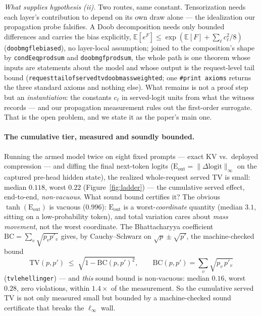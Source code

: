 \documentclass[11pt]{article}
\renewcommand{\_}{\WCorigunderscore\allowbreak}
\begin{document}
\emph{What supplies hypothesis (ii).} Two routes, same constant.
Tensorization needs each layer's contribution to depend on its own draw
alone --- the idealization our propagation probe falsifies. A Doob
decomposition needs only bounded differences and carries the bias
explicitly, $\mathbb{E}[e^F]\le\exp(\mathbb{E}[F]+\sum_\ell c_\ell^2/8)$
(\texttt{doob\_mgf\_le\_biased}), no layer-local assumption; joined to
the composition's shape by \texttt{condE\_eq\_prod\_sum} and
\texttt{doob\_mgf\_prod\_sum}, the whole path is one theorem whose
inputs are statements about the model and whose output is the
request-level tail bound
(\texttt{request\_tail\_of\_served\_tv\_doob\_massweighted}; one
\texttt{\#print axioms} returns the three standard axioms and nothing
else). What remains is not a proof step but an \emph{instantiation}:
the constants $c_\ell$ in served-logit units from what the witness
records --- and our propagation measurement rules out the first-order
surrogate. That is the open problem, and we state it as the paper's
main one.\medskip



\paragraph{The cumulative tier, measured and soundly bounded.}
Running the armed model twice on eight fixed prompts --- exact KV vs.\
deployed compression --- and diffing the final next-token logits
($\mathrm{E_{out}}=\|\Delta\mathrm{logit}\|_\infty$ on the captured
pre-head hidden state), the realized whole-request served TV is small:
median $0.118$, worst $0.22$ (Figure~\ref{fig:ladder}) --- the
cumulative served effect, end-to-end, \emph{non-vacuous}. What sound
bound certifies it? The obvious $\tanh(\mathrm{E_{out}})$ is vacuous
($0.996$): $\mathrm{E_{out}}$ is a worst-\emph{coordinate} quantity
(median $3.1$, sitting on a low-probability token), and total variation
cares about \emph{mass movement}, not the worst coordinate. The
Bhattacharyya coefficient $\mathrm{BC}=\sum_v\sqrt{p_v p'_v}$ gives, by
Cauchy--Schwarz on $\sqrt{p}\pm\sqrt{p'}$, the machine-checked bound
\begin{equation}
\mathrm{TV}(p,p')\;\le\;\sqrt{1-\mathrm{BC}(p,p')^{2}},
\qquad
\mathrm{BC}(p,p')=\sum_v\sqrt{p_v\,p'_v}
\label{eq:tvbc}
\end{equation}
(\texttt{tv\_le\_hellinger}) --- and \emph{this} sound bound is
non-vacuous: median $0.16$, worst $0.28$, zero violations, within
$1.4\times$ of the measurement. So the cumulative served TV is not only
measured small but bounded by a machine-checked sound certificate that
breaks the $\ell_\infty$ wall. 
\end{document}
